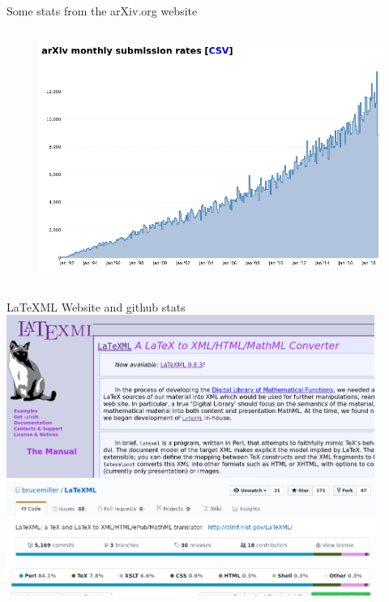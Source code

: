 \documentclass[9pt]{beamer}
\begin{document}
\begin{frame}{Some stats from the arXiv.org website}
\begin{columns}[T]
\begin{column}{0.5\textwidth}
\begin{figure}[h]
    \includegraphics[width=\textwidth]{subm_rates.png} 
            \end{figure}
			\end{column}
			\end{columns}
\end{frame}

\begin{frame}{LaTeXML Website and github stats}
    \includegraphics[width=0.9\textwidth]{ltxml_website.png}
    \includegraphics[width=0.9\textwidth]{ltxml_github1.png}
    \includegraphics[width=0.9\textwidth]{ltxml_github2.png}
\end{frame}
\end{document}

